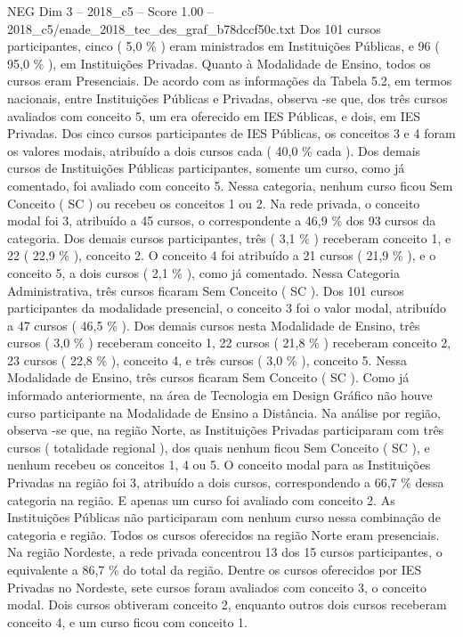 \begin{textsample}{NEG Dim 3 – 2018\_c5 – Score 1.00 – 2018\_c5/enade\_2018\_tec\_des\_graf\_b78dccf50c.txt}
Dos 101 cursos participantes, cinco ( 5,0 \% ) eram ministrados em Instituições Públicas, e 96 ( 95,0 \% ), em Instituições Privadas.
Quanto à Modalidade de Ensino, todos os cursos eram Presenciais.
De acordo com as informações da Tabela 5.2, em termos nacionais, entre Instituições Públicas e Privadas, observa -se que, dos três cursos avaliados com conceito 5, um era oferecido em IES Públicas, e dois, em IES Privadas.
Dos cinco cursos participantes de IES Públicas, os conceitos 3 e 4 foram os valores modais, atribuído a dois cursos cada ( 40,0 \% cada ).
Dos demais cursos de Instituições Públicas participantes, somente um curso, como já comentado, foi avaliado com conceito 5.
Nessa categoria, nenhum curso ficou Sem Conceito ( SC ) ou recebeu os conceitos 1 ou 2.
Na rede privada, o conceito modal foi 3, atribuído a 45 cursos, o correspondente a 46,9 \% dos 93 cursos da categoria.
Dos demais cursos participantes, três ( 3,1 \% ) receberam conceito 1, e 22 ( 22,9 \% ), conceito 2.
O conceito 4 foi atribuído a 21 cursos ( 21,9 \% ), e o conceito 5, a dois cursos ( 2,1 \% ), como já comentado.
Nessa Categoria Administrativa, três cursos ficaram Sem Conceito ( SC ).
Dos 101 cursos participantes da modalidade presencial, o conceito 3 foi o valor modal, atribuído a 47 cursos ( 46,5 \% ).
Dos demais cursos nesta Modalidade de Ensino, três cursos ( 3,0 \% ) receberam conceito 1, 22 cursos ( 21,8 \% ) receberam conceito 2, 23 cursos ( 22,8 \% ), conceito 4, e três cursos ( 3,0 \% ), conceito 5.
Nessa Modalidade de Ensino, três cursos ficaram Sem Conceito ( SC ).
Como já informado anteriormente, na área de Tecnologia em Design Gráfico não houve curso participante na Modalidade de Ensino a Distância.
Na análise por região, observa -se que, na região Norte, as Instituições Privadas participaram com três cursos ( totalidade regional ), dos quais nenhum ficou Sem Conceito ( SC ), e nenhum recebeu os conceitos 1, 4 ou 5.
O conceito modal para as Instituições Privadas na região foi 3, atribuído a dois cursos, correspondendo a 66,7 \% dessa categoria na região.
E apenas um curso foi avaliado com conceito 2.
As Instituições Públicas não participaram com nenhum curso nessa combinação de categoria e região.
Todos os cursos oferecidos na região Norte eram presenciais.
Na região Nordeste, a rede privada concentrou 13 dos 15 cursos participantes, o equivalente a 86,7 \% do total da região.
Dentre os cursos oferecidos por IES Privadas no Nordeste, sete cursos foram avaliados com conceito 3, o conceito modal.
Dois cursos obtiveram conceito 2, enquanto outros dois cursos receberam conceito 4, e um curso ficou com conceito 1.

\end{textsample}
